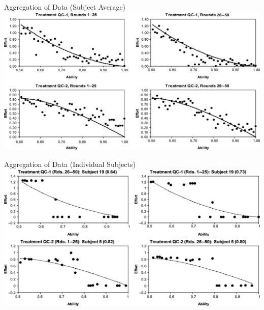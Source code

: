 \documentclass{beamer}
\begin{document}
\begin{frame}{Aggregation of Data (Subject Average)}
\includegraphics[width=1.0\textwidth]{./i/SchotterMueller1.eps}
\end{frame}
\begin{frame}{Aggregation of Data (Individual Subjects)}
\includegraphics[width=1.0\textwidth]{./i/SchotterMueller2.eps}
\end{frame}
\end{document}
